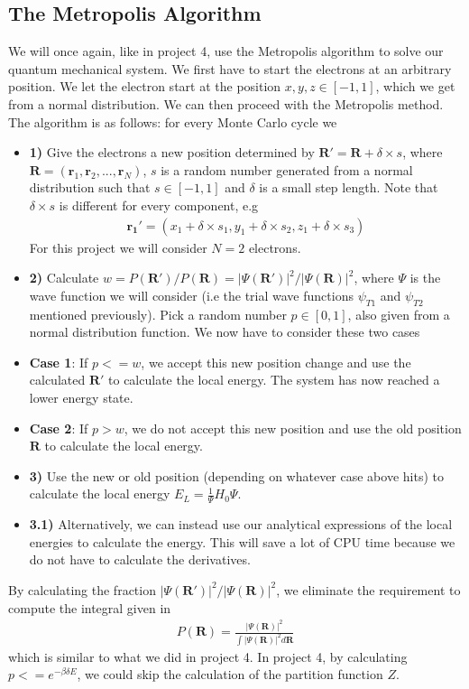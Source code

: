 \documentclass[12pt]{article}
\begin{document}
\subsection{The Metropolis Algorithm}
We will once again, like in project 4, use the Metropolis algorithm to solve our quantum mechanical system. We first have to start the electrons at an arbitrary position. We let the electron start at the position $x,y,z \in [-1,1]$, which we get from a normal distribution. We can then proceed with the Metropolis method. The algorithm is as follows: for every Monte Carlo cycle we 
\begin{itemize}
\item \textbf{1)} Give the electrons a new position determined by $\mathbf{R}' = \mathbf{R} + \delta\times s$, where $\mathbf{R} = (\mathbf{r}_1, \mathbf{r}_2, ..., \mathbf{r}_N)$, $s$ is a random number generated from a normal distribution such that $s\in [-1,1]$ and $\delta$ is a small step length. Note that $\delta \times s$ is different for every component, e.g
\begin{align*}
\mathbf{r_1}' = (x_1 + \delta\times s_1, y_1 + \delta\times s_2, z_1 + \delta\times s_3)
\end{align*} For this project we will consider $N=2$ electrons.

\item \textbf{2)} Calculate $w = P(\mathbf{R}')/P(\mathbf{R}) = |\Psi(\mathbf{R}')|^2/|\Psi(\mathbf{R})|^2$, where $\Psi$ is the wave function we will consider (i.e the trial wave functions $\psi_{T1}$ and $\psi_{T2}$ mentioned previously). Pick a random number $p\in [0,1]$, also given from a normal distribution function. We now have to consider these two cases

\item \textbf{Case 1}: If $p <= w$, we accept this new position change and use the calculated $\mathbf{R}'$ to calculate the local energy. The system has now reached a lower energy state.

\item \textbf{Case 2}: If $p > w$, we do not accept this new position and use the old position $\mathbf{R}$ to calculate the local energy.

\item \textbf{3)} Use the new or old position (depending on whatever case above hits) to calculate the local energy $E_L = \frac{1}{\Psi} H_0\Psi$. 

\item \textbf{3.1)} Alternatively, we can instead use our analytical expressions of the local energies to calculate the energy. This will save a lot of CPU time because we do not have to calculate the derivatives.
\end{itemize}
By calculating the fraction $|\Psi(\mathbf{R}')|^2/|\Psi(\mathbf{R})|^2$, we eliminate the requirement to compute the integral given in
\begin{align*}
P(\mathbf{R}) = \frac{|\Psi(\mathbf{R})|^2}{\int |\Psi(\mathbf{R})|^2 d\mathbf{R}}
\end{align*}
which is similar to what we did in project 4. In project 4, by calculating $p<= e^{-\beta \delta E}$, we could skip the calculation of the partition function $Z$. 
\end{document}
